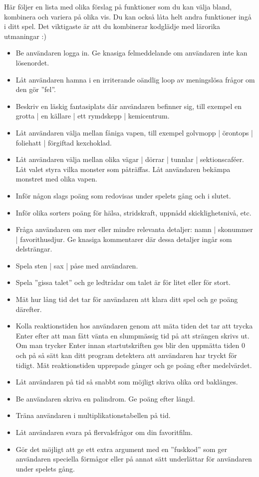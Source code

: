 Här följer en lista med olika förslag på funktioner som du kan välja bland, kombinera och variera på olika vis. Du kan också låta helt andra funktioner ingå i ditt spel. Det viktigaste är att du kombinerar kodglädje med lärorika utmaningar :)

\begin{itemize}
\item Be användaren logga in. Ge knasiga felmeddelande om användaren inte kan lösenordet.
\item Låt användaren hamna i en irriterande oändlig loop av meningslösa frågor om den gör ''fel''.
\item Beskriv en läskig fantasiplats där användaren befinner sig, till exempel en grotta | en källare | ett rymdskepp | kemicentrum.
\item Låt användaren välja mellan fåniga vapen, till exempel golvmopp | örontops | foliehatt | förgiftad kexchoklad.
\item Låt användaren välja mellan olika vägar | dörrar | tunnlar | sektionscaféer. Låt valet styra vilka monster som påträffas. Låt användaren bekämpa monstret med olika vapen.
\item Inför någon slags poäng som redovisas under spelets gång och i slutet.
\item Inför olika sorters poäng för hälsa, stridskraft, uppnådd skicklighetsnivå, etc.
\item Fråga användaren om mer eller mindre relevanta detaljer: namn | skonummer | favorithusdjur. Ge knasiga kommentarer där dessa detaljer ingår som delsträngar.
\item Spela sten | sax | påse med användaren.
\item Spela ''gissa talet'' och ge ledtrådar om talet är för litet eller för stort.
\item Mät hur lång tid det tar för användaren att klara ditt spel och ge poäng därefter.
\item Kolla reaktionstiden hos användaren genom att mäta tiden det tar att trycka Enter efter att man fått vänta en slumpmässig tid på att strängen  skrivs ut. Om man trycker Enter innan startutskriften ges blir den uppmätta tiden 0 och på så sätt kan ditt program detektera att användaren har tryckt för tidigt. Mät reaktionstiden upprepade gånger och ge poäng efter medelvärdet.
\item Låt användaren på tid så snabbt som möjligt skriva olika ord baklänges.
\item Be användaren skriva en palindrom. Ge poäng efter längd.
\item Träna användaren i multiplikationstabellen på tid.
\item Låt användaren svara på flervalsfrågor om din favoritfilm.
\item Gör det möjligt att ge ett extra argument med en ''fuskkod'' som ger användaren speciella förmågor eller på annat sätt underlättar för användaren under spelets gång.
\end{itemize}


